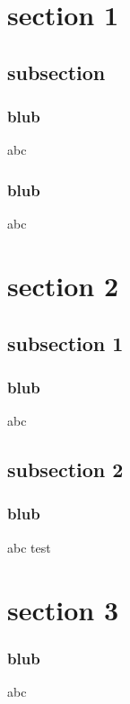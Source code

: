\documentclass{beamer}
\begin{document}
\section{section 1}
\subsection{subsection}
\begin{frame}
\frametitle{blub}
    abc
\end{frame} 
\begin{frame}
\frametitle{blub}
    abc
\end{frame} 

\section{section 2}
\subsection{subsection 1}
\begin{frame}
\frametitle{blub}
    abc
\end{frame} 

\subsection{subsection 2}
\begin{frame}
\frametitle{blub}
    abc test
\end{frame} 

\section{section 3}
\begin{frame}
\frametitle{blub}
    abc
\end{frame}     
\end{document}
